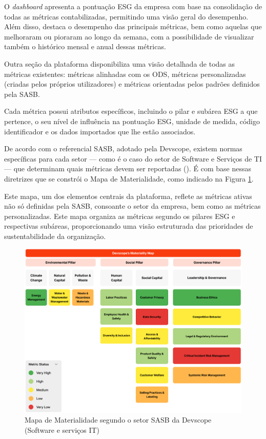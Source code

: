 O \textit{dashboard} apresenta a pontuação ESG da empresa com base na consolidação de todas as métricas contabilizadas, permitindo uma visão geral do desempenho. Além disso, destaca o desempenho das principais métricas, bem como aquelas que melhoraram ou pioraram ao longo da semana, com a possibilidade de visualizar também o histórico mensal e anual dessas métricas.

Outra seção da plataforma disponibiliza uma visão detalhada de todas as métricas existentes: métricas alinhadas com os \gls{ODS}, métricas personalizadas (criadas pelos próprios utilizadores) e métricas orientadas pelos padrões definidos pela \gls{SASB}.

Cada métrica possui atributos específicos, incluindo o pilar e subárea ESG a que pertence, o seu nível de influência na pontuação ESG, unidade de medida, código identificador e os dados importados que lhe estão associados.

De acordo com o referencial \gls{SASB}, adotado pela Devscope, existem normas específicas para cada setor — como é o caso do setor de Software e Serviços de TI — que determinam quais métricas devem ser reportadas (\cite{SASBSector2025}). É com base nessas diretrizes que se constrói o Mapa de Materialidade, como indicado na Figura \ref{fig:materiality_map}.

Este mapa, um dos elementos centrais da plataforma, reflete as métricas ativas não só definidas pela \gls{SASB}, consoante o setor da empresa, bem como as métricas personalizadas. Este mapa organiza as métricas segundo os pilares ESG e respectivas subáreas, proporcionando uma visão estruturada das prioridades de sustentabilidade da organização.

\begin{figure}[h]
    \centering
    \includegraphics[width=\linewidth]{frontmatter/assets/mapa-materialidade.png}
    \caption{Mapa de Materialidade segundo o setor SASB da Devscope (Software e serviços IT)}
    \label{fig:materiality_map}
\end{figure}

